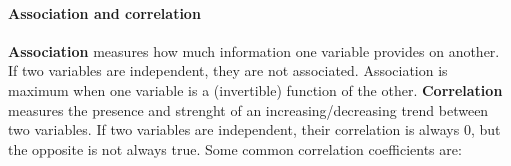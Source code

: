 \paragraph{Association and correlation}
\textbf{Association} measures how much information one variable provides on another. If two variables are independent, they are not associated. Association is maximum when one variable is a (invertible) function of the other. \textbf{Correlation} measures the presence and strenght of an increasing/decreasing trend between two variables. If two variables are independent, their correlation is always 0, but the opposite is not always true.
Some common correlation coefficients are:
